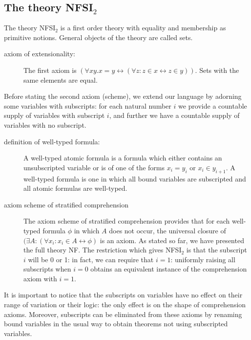 \documentclass{article}
\begin{document}
\begin{description}
\section{The theory NFSI$_2$}

The theory NFSI$_2$ is a first order theory with equality and membership as primitive notions.  General objects of the theory are called sets.

\begin{description}

\item[axiom of extensionality:]  The first axiom is $(\forall xy.x=y \leftrightarrow (\forall z:z \in x \leftrightarrow z \in y))$.  Sets with the same elements are equal.

\end{description}

Before stating the second axiom (scheme), we extend our language by adorning some variables with subscripts:  for each natural number $i$ we
provide a countable supply of variables with subscript $i$, and further we have a countable supply of variables with no subscript.

\begin{description}

\item[definition of well-typed formula:]  A well-typed atomic formula is a formula which either contains an unsubscripted variable or is of one of the forms $x_i = y_i$
or $x_i \in y_{i+1}$.  A well-typed formula is one in which all bound variables are subscripted and all atomic formulas are well-typed.

\item[axiom scheme of stratified comprehension]  The axiom scheme of stratified comprehension provides that for each well-typed formula $\phi$ in which $A$ does not occur,
the universal closure of $(\exists A:(\forall x_i:x_i \in A \leftrightarrow \phi)$ is an axiom.  As stated so far, we have presented the full theory NF.
The restriction which gives NFSI$_2$ is that the subscript $i$ will be 0 or 1:  in fact, we can require that $i=1$: uniformly raising all
subscripts when $i=0$ obtains an equivalent instance of the comprehension axiom with $i=1$.

\end{description}

It is important to notice that the subscripts on variables have no effect on their range of variation or their logic:  the only effect is on the shape of comprehension axioms.  Moreover, subscripts can be eliminated from these axioms by renaming bound variables in the usual way to obtain theorems not using subscripted variables.


\end{description}
\end{document}
